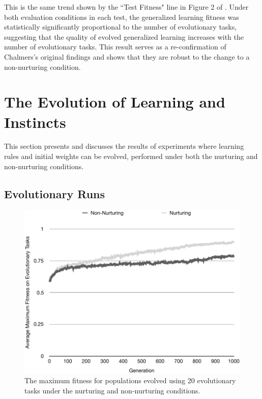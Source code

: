 \documentclass[master]{outhesis}
\begin{document}
This is the same trend shown by the ``Test Fitness" line in Figure 2 of \citet{Chalmers:1990aa}.
Under both evaluation conditions in each test,
the generalized learning fitness was statistically significantly proportional to the number of evolutionary tasks,
suggesting that the quality of evolved generalized learning increases with the number of evolutionary tasks.
This result serves as a re-confirmation of Chalmers's original findings \citep{Chalmers:1990aa}
and shows that they are robust to the change to a non-nurturing condition.

\section{The Evolution of Learning and Instincts}

This section presents and discusses the results of experiments where learning rules and initial weights can be evolved, performed under both the nurturing and non-nurturing conditions.

\subsection{Evolutionary Runs}

\begin{figure}[h]
	\centering
	\includegraphics{LearningInstinctsEvolution.pdf}
	\caption{The maximum fitness for populations evolved using 20 evolutionary tasks under the nurturing and non-nurturing conditions.}
	\label{fig:LearningInstinctsEvolution}
\end{figure}
\end{document}
